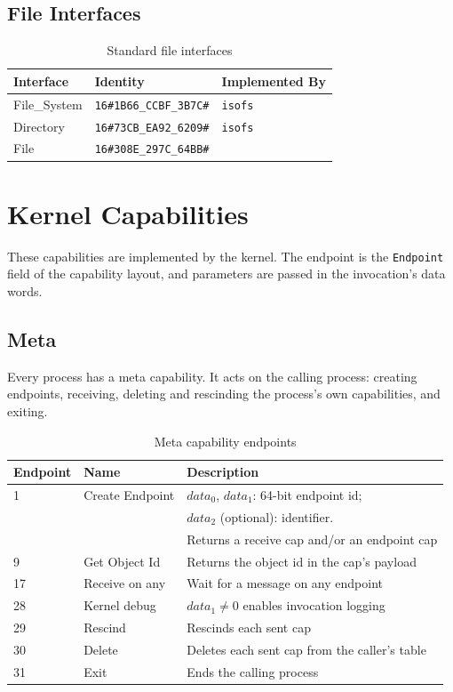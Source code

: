 \subsection{File Interfaces}

\begin{table}[ht]
\begin{tabular}{l l l}
\hline\hline
Interface & Identity & Implemented By \\ [0.5ex]
\hline
File\_System  & {\tt 16\#1B66\_CCBF\_3B7C\#} & {\tt isofs} \\
Directory     & {\tt 16\#73CB\_EA92\_6209\#} & {\tt isofs} \\
File          & {\tt 16\#308E\_297C\_64BB\#} & \\
\hline
\end{tabular}
\caption{Standard file interfaces}
\label{table:file_interfaces}
\end{table}

\section{Kernel Capabilities}

These capabilities are implemented by the kernel.  The endpoint is the {\tt Endpoint} field of the capability layout, and parameters are passed in the invocation's data words.

\subsection{Meta}
\label{sec:meta-interface}

Every process has a meta capability.  It acts on the calling process: creating endpoints, receiving, deleting and rescinding the process's own capabilities, and exiting.

\begin{table}[ht]
\begin{tabular}{l l l}
\hline\hline
Endpoint & Name & Description \\ [0.5ex]
\hline
1  & Create Endpoint & $data_0$, $data_1$: 64-bit endpoint id; \\
   &                 & $data_2$ (optional): identifier. \\
   &                 & Returns a receive cap and/or an endpoint cap \\
9  & Get Object Id   & Returns the object id in the cap's payload \\
17 & Receive on any  & Wait for a message on any endpoint \\
28 & Kernel debug    & $data_1 \neq 0$ enables invocation logging \\
29 & Rescind         & Rescinds each sent cap \\
30 & Delete          & Deletes each sent cap from the caller's table \\
31 & Exit            & Ends the calling process \\
\hline
\end{tabular}
\caption{Meta capability endpoints}
\label{table:meta_interface}
\end{table}

